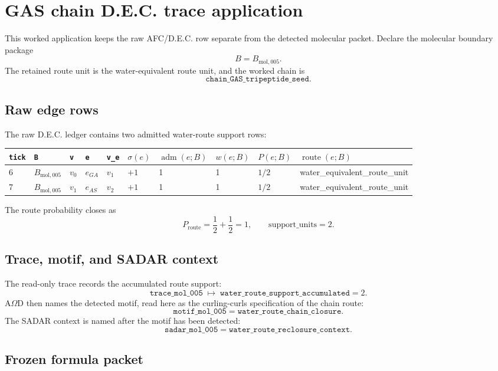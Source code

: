 
\section{GAS chain D.E.C. trace application}

This worked application keeps the raw AFC/D.E.C. row separate from the detected molecular packet. Declare the molecular boundary package
\[
B=B_{\mathrm{mol},005}.
\]
The retained route unit is the water-equivalent route unit, and the worked chain is
\[
\texttt{chain\_GAS\_tripeptide\_seed}.
\]

\subsection{Raw edge rows}

The raw D.E.C. ledger contains two admitted water-route support rows:
\begin{center}
\scriptsize
\begin{tabularx}{0.99\linewidth}{@{}llllllllll@{}}
\toprule
\texttt{tick} & \texttt{B} & \texttt{v} & \texttt{e} & \texttt{v\_e} & $\sigma(e)$ & $\operatorname{adm}(e;B)$ & $w(e;B)$ & $P(e;B)$ & $\operatorname{route}(e;B)$ \\
\midrule
6 & $B_{\mathrm{mol},005}$ & $v_0$ & $e_{GA}$ & $v_1$ & $+1$ & 1 & 1 & $1/2$ & water\_equivalent\_route\_unit \\
7 & $B_{\mathrm{mol},005}$ & $v_1$ & $e_{AS}$ & $v_2$ & $+1$ & 1 & 1 & $1/2$ & water\_equivalent\_route\_unit \\
\bottomrule
\end{tabularx}
\end{center}
The route probability closes as
\[
P_{\mathrm{route}}=\frac12+\frac12=1,
\qquad
\mathrm{support\_units}=2.
\]

\subsection{Trace, motif, and SADAR context}

The read-only trace records the accumulated route support:
\[
\texttt{trace\_mol\_005}\;\mapsto\;\texttt{water\_route\_support\_accumulated}=2.
\]
A$\Omega$D then names the detected motif, read here as the curling-curls specification of the chain route:
\[
\texttt{motif\_mol\_005}=\texttt{water\_route\_chain\_closure}.
\]
The SADAR context is named after the motif has been detected:
\[
\texttt{sadar\_mol\_005}=\texttt{water\_route\_reclosure\_context}.
\]

\subsection{Frozen formula packet}


